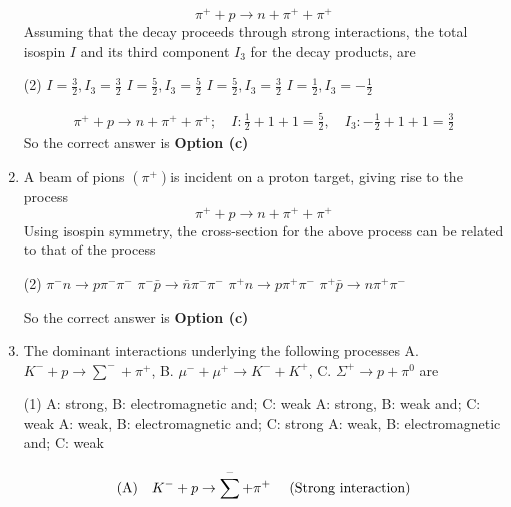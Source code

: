 \begin{enumerate}
	$$
	\pi^{+}+p \rightarrow n+\pi^{+}+\pi^{+}
	$$
	Assuming that the decay proceeds through strong interactions, the total isospin $I$ and its third component $I_3$ for the decay products, are
	{}
	\begin{tasks}(2)
		\task[\textbf{a.}] $I=\frac{3}{2}, I_3=\frac{3}{2}$
		\task[\textbf{b.}]$I=\frac{5}{2}, I_3=\frac{5}{2}$
		\task[\textbf{c.}]$I=\frac{5}{2}, I_3=\frac{3}{2}$
		\task[\textbf{d.}] $I=\frac{1}{2}, I_3=-\frac{1}{2}$
	\end{tasks}
	\begin{answer}
		\begin{align*}
		\pi^{+}+p \rightarrow n+\pi^{+}+\pi^{+} ; \quad I: \frac{1}{2}+1+1=\frac{5}{2}, \quad I_3:-\frac{1}{2}+1+1=\frac{3}{2}
		\end{align*}
		So the correct answer is \textbf{Option (c)}
	\end{answer}
	\item  A beam of pions $\left(\pi^{+}\right)$is incident on a proton target, giving rise to the process
	$$
	\pi^{+}+p \rightarrow n+\pi^{+}+\pi^{+}
	$$
	Using isospin symmetry, the cross-section for the above process can be related to that of the process
	\begin{tasks}(2)
		\task[\textbf{a.}]$\pi^{-} n \rightarrow p \pi^{-} \pi^{-}$
		\task[\textbf{b.}]$\pi^{-} \bar{p} \rightarrow \bar{n} \pi^{-} \pi^{-}$
		\task[\textbf{c.}]$\pi^{+} n \rightarrow p \pi^{+} \pi^{-}$
		\task[\textbf{d.}]  $\pi^{+} \bar{p} \rightarrow n \pi^{+} \pi^{-}$
	\end{tasks}
	\begin{answer}
		So the correct answer is \textbf{Option (c)}
	\end{answer}
	\item  The dominant interactions underlying the following processes
	A. $K^{-}+p \rightarrow \sum^{-}+\pi^{+}$, B. $\mu^{-}+\mu^{+} \rightarrow K^{-}+K^{+}$, C. $\Sigma^{+} \rightarrow p+\pi^0$ are
	{}
	\begin{tasks}(1)
		\task[\textbf{a.}]A: strong, B: electromagnetic and; C: weak
		\task[\textbf{b.}]A: strong, B: weak and; C: weak
		\task[\textbf{c.}]A: weak, B: electromagnetic and; C: strong
		\task[\textbf{d.}]  A: weak, B: electromagnetic and; C: weak
	\end{tasks}
	\begin{answer}
		\begin{align*}
		&\text{(A)\quad }K^{-}+p \rightarrow \sum^{-}+\pi^{+} \quad\text{ (Strong interaction)}\\

\end{align*}
\end{answer}
\end{enumerate}
